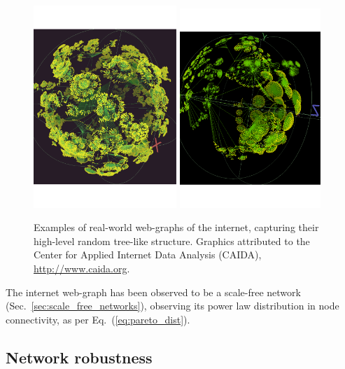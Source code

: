 \else
	\begin{figure}[!htbp]
	\includegraphics[width=0.481\textwidth]{webgraph_1}
	\includegraphics[width=0.475\textwidth]{webgraph_2}
	\caption{Examples of real-world web-graphs of the internet, capturing their high-level random tree-like structure. Graphics attributed to the Center for Applied Internet Data Analysis (CAIDA), \href{http://www.caida.org}{http://www.caida.org}.} \label{fig:webgraph}
	\end{figure}
\fi

The internet web-graph has been observed to be a scale-free network (Sec.~\ref{sec:scale_free_networks}), observing its power law distribution in node connectivity, as per Eq.~(\ref{eq:pareto_dist}).

%
%

\subsection{Network robustness}

